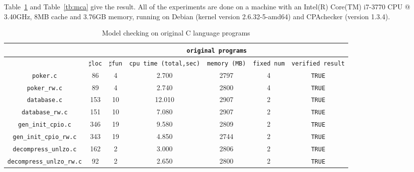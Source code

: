 Table~\ref{tb:mcc} and Table~\ref{tb:mca} give the result.  All of the
experiments are done on a machine with an Intel(R) Core(TM) i7-3770
CPU @ 3.40GHz, 8MB cache and 3.76GB memory, running on Debian (kernel
version 2.6.32-5-amd64) and CPAchecker (version 1.3.4).

\begin{table}
  \scriptsize
\begin{tabular}{|c|c|c|c|c|c|c|}
\hline
& \multicolumn{6}{|c|}{\texttt{original programs}}  \\
\hline
 & $\sharp$\texttt{loc} & $\sharp$\texttt{fun} & \texttt{cpu time (total,sec)} & \texttt{memory (MB)} & \texttt{fixed num}& \texttt{verified result} \\
\hline
\texttt{poker.c} & 86 & 4 & 2.700 & 2797 & 4  & \texttt{TRUE}  \\
\hline
\texttt{poker\_rw.c} & 89 & 4 & 2.740 & 2800 & 4  & \texttt{TRUE}  \\
\hline
\texttt{database.c} & 153 & 10 & 12.010 & 2907 & 2  & \texttt{TRUE}  \\
\hline
\texttt{database\_rw.c} & 151 & 10 & 7.080 & 2907 & 2  & \texttt{TRUE}  \\
\hline
\texttt{gen\_init\_cpio.c} & 346 & 19 & 9.580 & 2809 & 2  & \texttt{TRUE}  \\
\hline
\texttt{gen\_init\_cpio\_rw.c} & 343 &19  & 4.850  & 2744  & 2  & \texttt{TRUE}  \\
\hline
\texttt{decompress\_unlzo.c} & 162 & 2  & 3.000  & 2806  & 2  & \texttt{TRUE}  \\
\hline
\texttt{decompress\_unlzo\_rw.c} & 92 & 2  & 2.650  & 2800  & 2  & \texttt{TRUE}  \\

\hline
\end{tabular}
\caption{Model checking on original C language programs}
\label{tb:mcc}
\end{table}

